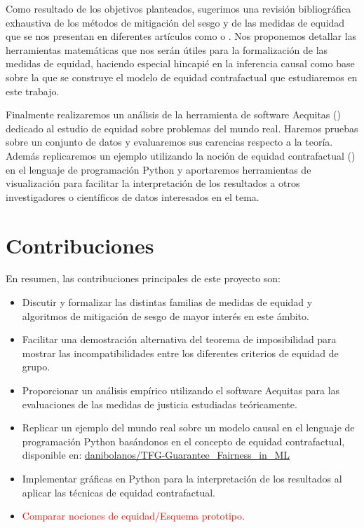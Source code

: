 \documentclass[oneside,openright,titlepage,numbers=noenddot,openany,headinclude,footinclude=true,
cleardoublepage=empty,abstractoff,BCOR=5mm,paper=a4,fontsize=12pt,main=spanish]{scrreprt}
\begin{document}
Como resultado de los objetivos planteados, sugerimos una revisión bibliográfica exhaustiva
de los métodos de mitigación del sesgo y de las medidas de equidad que se nos presentan en diferentes artículos como \cite{formalizing2018} o \cite{definitions2018}. Nos proponemos detallar las herramientas matemáticas que nos serán útiles para la formalización de las medidas de equidad, haciendo especial hincapié en la inferencia causal como base sobre la que se construye el modelo de equidad contrafactual que estudiaremos en este trabajo.

Finalmente realizaremos un análisis de la herramienta de software Aequitas (\cite{aequitas2019}) dedicado al estudio de equidad sobre problemas del mundo real. Haremos pruebas sobre un conjunto de datos y evaluaremos sus carencias respecto a la teoría. Además replicaremos un ejemplo utilizando la noción de equidad contrafactual (\cite{counterfactual2018}) en el lenguaje de programación Python y aportaremos herramientas de visualización para facilitar la interpretación de los resultados a otros investigadores o científicos de datos interesados en el tema.

\section{Contribuciones}

En resumen, las contribuciones principales de este proyecto son:

\begin{itemize}
    \item Discutir y formalizar las distintas familias de medidas de equidad y algoritmos de mitigación de sesgo de mayor interés en este ámbito.
    \item Facilitar una demostración alternativa del teorema de imposibilidad para mostrar las incompatibilidades entre los diferentes criterios de equidad de grupo.
    \item Proporcionar un análisis empírico utilizando el software Aequitas para las evaluaciones de las medidas de justicia estudiadas teóricamente.
    \item Replicar un ejemplo del mundo real sobre un modelo causal en el lenguaje de programación Python basándonos en el concepto de equidad contrafactual, disponible en: \href{https://github.com/danibolanos/TFG-Guarantee_Fairness_in_ML.git}{danibolanos/TFG-Guarantee\_Fairness\_in\_ML}
    \item Implementar gráficas en Python para la interpretación de los resultados al aplicar las técnicas de equidad contrafactual.
    \item \textcolor{red}{Comparar nociones de equidad/Esquema prototipo}.
\end{itemize}
\end{document}

